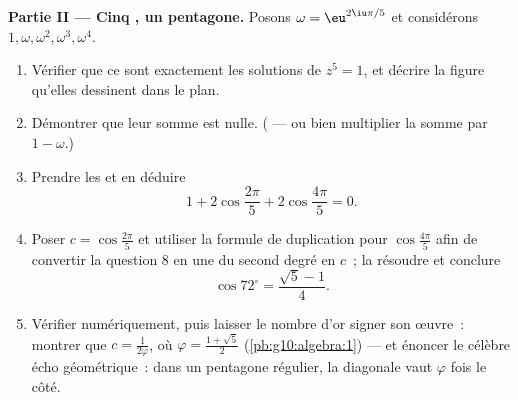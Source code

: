 \begin{problem}
\medskip
\noindent\textbf{Partie II --- Cinq , un pentagone.}
Posons $\omega = \eu^{2\iu\pi/5}$ et considérons
$1, \omega, \omega^2, \omega^3, \omega^4$.
\begin{enumerate}[resume]
  \item Vérifier que ce sont exactement les solutions de
        $z^5 = 1$, et décrire la figure qu'elles dessinent dans le
        plan.
  \item Démontrer que leur somme est nulle. ( ---
        ou bien multiplier la somme par $1 - \omega$.)
  \item Prendre les  et en déduire
        \[
        1 + 2\cos\frac{2\pi}{5} + 2\cos\frac{4\pi}{5} = 0 .
        \]
  \item Poser $c = \cos\frac{2\pi}{5}$ et utiliser la formule de
        duplication pour $\cos\frac{4\pi}{5}$ afin de convertir la
        question 8 en une  du second degré en $c$~; la
        résoudre et conclure
        \[
        \cos 72^\circ = \frac{\sqrt5 - 1}{4} .
        \]
  \item Vérifier numériquement, puis laisser le nombre d'or signer
        son œuvre~: montrer que $c = \frac{1}{2\varphi}$, où
        $\varphi = \frac{1 + \sqrt5}{2}$
        (\cref{pb:g10:algebra:1}) --- et énoncer le célèbre écho
        géométrique~: dans un pentagone régulier, la diagonale vaut
        $\varphi$ fois le côté.
\end{enumerate}


\end{problem}
